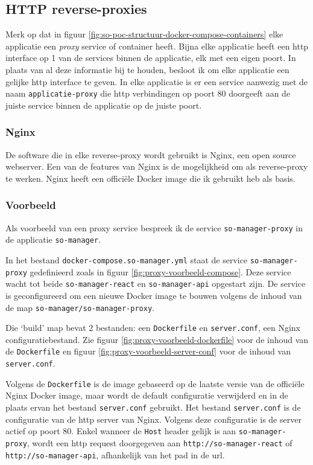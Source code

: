 \documentclass[a4paper,12pt]{report}
\begin{document}
\subsection{HTTP reverse-proxies}
Merk op dat in figuur \ref{fig:so-poc-structuur-docker-compose-containers} elke applicatie een \emph{proxy} service of container heeft.
Bijna elke applicatie heeft een http interface op 1 van de services binnen de applicatie, elk met een eigen poort.
In plaats van al deze informatie bij te houden, besloot ik om elke applicatie een gelijke http interface te geven.
In elke applicatie is er een service aanwezig met de naam \lstinline|applicatie-proxy| die http verbindingen op poort 80 doorgeeft aan de juiste service binnen de applicatie op de juiste poort.

\subsubsection{Nginx}
De software die in elke reverse-proxy wordt gebruikt is Nginx, een open source webserver.
Een van de features van Nginx is de mogelijkheid om als reverse-proxy te werken.
Nginx heeft een officiële Docker image die ik gebruikt heb als basis.
\autocite{nginx:about}

\subsubsection{Voorbeeld}
Als voorbeeld van een proxy service bespreek ik de service \lstinline|so-manager-proxy| in de applicatie \lstinline|so-manager|.

In het bestand \lstinline|docker-compose.so-manager.yml| staat de service \lstinline|so-manager-proxy| gedefinieerd zoals in figuur \ref{fig:proxy-voorbeeld-compose}.
Deze service wacht tot beide \lstinline|so-manager-react| en \lstinline|so-manager-api| opgestart zijn.
De service is geconfigureerd om een nieuwe Docker image te bouwen volgens de inhoud van de map \lstinline|so-manager/so-manager-proxy|.

Die `build' map bevat 2 bestanden: een \lstinline|Dockerfile| en \lstinline|server.conf|, een Nginx configuratiebestand.
Zie figuur \ref{fig:proxy-voorbeeld-dockerfile} voor de inhoud van de \lstinline|Dockerfile| en figuur \ref{fig:proxy-voorbeeld-server-conf} voor de inhoud van \lstinline|server.conf|.

Volgens de \lstinline|Dockerfile| is de image gebaseerd op de laatste versie van de officiële Nginx Docker image, maar wordt de default configuratie verwijderd en in de plaats ervan het bestand \lstinline|server.conf| gebruikt.
Het bestand \lstinline|server.conf| is de configuratie van de http server van Nginx.
Volgens deze configuratie is de server actief op poort 80.
Enkel wanneer de \lstinline|Host| header gelijk is aan \lstinline|so-manager-proxy|, wordt een http request doorgegeven aan \lstinline|http://so-manager-react| of \lstinline|http://so-manager-api|, afhankelijk van het pad in de url.
\end{document}
